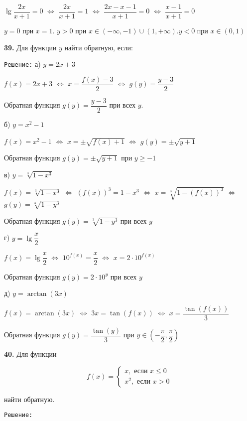 \documentclass[12pt]{article}
\begin{document}
	$\lg\dfrac{2x}{x+1} = 0$ $\Leftrightarrow$ $\dfrac{2x}{x+1} = 1$ $\Leftrightarrow$ $\dfrac{2x-x-1}{x+1}=0$ $\Leftrightarrow$ $\dfrac{x-1}{x+1}=0$
	
	$y=0$ при $x=1$. \quad $y>0$ при $x\in (-\infty, -1)\cup (1,+\infty)$.\quad$y<0$ при $x\in (0,1)$
	\medskip
	
	{\bf 39.} Для функции $y$ найти обратную, если:	
	
	{\tt Решение:} а) $y=2x+3$
	
	$f(x) = 2x+3$ $\Leftrightarrow$ $x = \dfrac{f(x)-3}{2}$ $\Leftrightarrow$ $g(y) = \dfrac{y-3}{2}$
	
	Обратная функция $g(y) = \dfrac{y-3}{2}$ при всех $y$.
	
	\quad б) $y=x^2-1$
	
	$f(x) = x^2-1$ $\Leftrightarrow$ $x = \pm \sqrt{f(x)+1}$	$\Leftrightarrow$ $g(y) = \pm \sqrt{y+1}$
	
	Обратная функция $g(y) = \pm \sqrt{y+1}$ при $y\ge -1$
	
	\quad в) $y=\sqrt[3]{1-x^3}$
	
	$f(x) = \sqrt[3]{1-x^3}$ $\Leftrightarrow$ $(f(x))^3 = 1-x^3$ $\Leftrightarrow$ $x = \sqrt[3]{1-(f(x))^3}$ $\Leftrightarrow$ $g(y) = \sqrt[3]{1-y^3}$
	
	Обратная функция $g(y) = \sqrt[3]{1-y^3}$ при всех $y$
	
	\quad г) $y=\lg\dfrac{x}{2}$
	
	$f(x) = \lg\dfrac{x}{2}$ $\Leftrightarrow$ $10^{f(x)} = \dfrac{x}{2}$ $\Leftrightarrow$ $x = 2\cdot10^{f(x)}$
	
	Обратная функция $g(y) = 2\cdot 10^y$ при всех $y$
	
	
	\quad д) $y=\arctan (3x)$
	
	$f(x) = \arctan(3x)$ $\Leftrightarrow$ $3x = \tan(f(x))$ $\Leftrightarrow$ $x = \dfrac{\tan(f(x))}{3}$
	
	Обратная функция $g(y) = \dfrac{\tan(y)}{3}$ при $y\in \left(-\dfrac{\pi}{2}, \dfrac{\pi}{2}\right)$
	\medskip
	
	{\bf 40.} Для функции 
	
	\begin{equation*}
	f(x) = \begin{cases}
		x, \text{ если } x\le 0 \\
		x^2, \text{ если } x>0
	\end{cases}
	\end{equation*}
	
	найти обратную.
	
	{\tt Решение:} 
	
\end{document}
